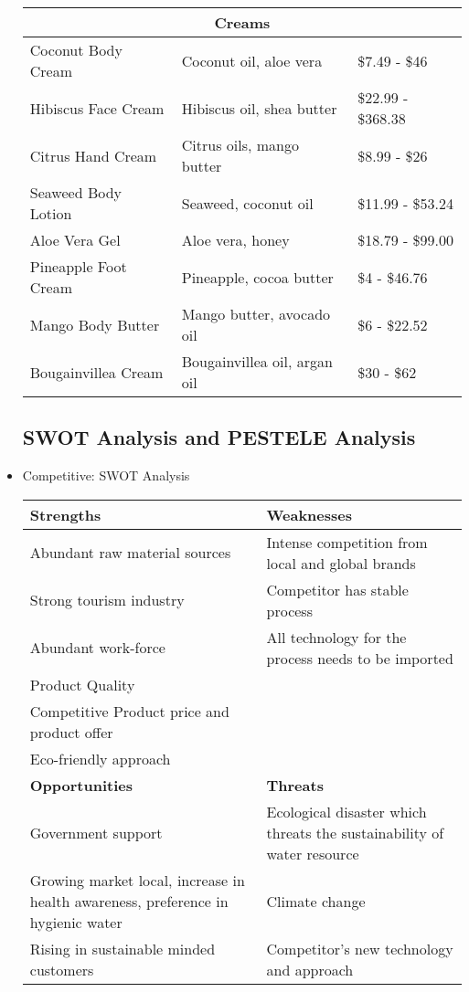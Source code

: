 \documentclass{article}
\begin{document}
\begin{itemize}
\begin{table}[H]
\begin{tabular}{@{}lll@{}}
\midrule
\multicolumn{3}{c}{\textbf{Creams}} \\
\midrule
Coconut Body Cream & Coconut oil, aloe vera & \$7.49 - \$46 \\
Hibiscus Face Cream & Hibiscus oil, shea butter & \$22.99 - \$368.38 \\
Citrus Hand Cream & Citrus oils, mango butter & \$8.99 - \$26 \\
Seaweed Body Lotion & Seaweed, coconut oil & \$11.99 - \$53.24 \\
Aloe Vera Gel & Aloe vera, honey & \$18.79 - \$99.00 \\
Pineapple Foot Cream & Pineapple, cocoa butter & \$4 - \$46.76 \\
Mango Body Butter & Mango butter, avocado oil & \$6 - \$22.52 \\
Bougainvillea Cream & Bougainvillea oil, argan oil & \$30 - \$62 \\
\bottomrule
\end{tabular}
\label{tab:products}
\end{table}

\subsection{SWOT Analysis and PESTELE Analysis}

\item Competitive: SWOT Analysis
\begin{table}[H]
\centering
\begin{tabular}{ | m{} | m{} | }
\hline
\textbf{Strengths} & \textbf{Weaknesses} \\
\hline
Abundant raw material sources & Intense competition from local and global brands \\
Strong tourism industry & Competitor has stable process \\
Abundant work-force & All technology for the process needs to be imported \\
Product Quality &  \\
Competitive Product price and product offer &  \\
Eco-friendly approach &  \\
\hline
\textbf{Opportunities} & \textbf{Threats} \\
\hline
Government support & Ecological disaster which threats the sustainability of water resource \\
Growing market local, increase in health awareness, preference in hygienic water & Climate change \\
Rising in sustainable minded customers & Competitor’s new technology and approach \\
\hline
\end{tabular}
\end{table}


\end{itemize}
\end{document}
